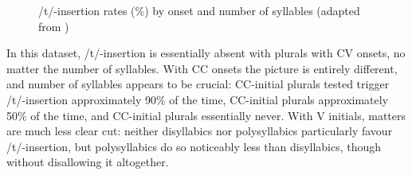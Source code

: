 \documentclass[output=paper]{langsci/langscibook}
\begin{document}
\begin{figure}
\caption{/t/-insertion rates (\%) by onset and number of syllables (adapted from \citealt{LucasSpagnol2016})}
\label{fig:lucas:1}


\end{figure}



 


In this dataset, /t/-insertion is essentially absent with plurals with CV onsets, no matter the number of syllables. With CC onsets the picture is entirely different, and number of syllables appears to be crucial:  CC-initial plurals tested trigger /t/-insertion approximately 90\% of the time,  CC-initial plurals approximately 50\% of the time, and  CC-initial plurals essentially never. With V initials, matters are much less clear cut: neither disyllabics nor polysyllabics particularly favour /t/-insertion, but polysyllabics do so noticeably less than disyllabics, though without disallowing it altogether.
\end{document}
